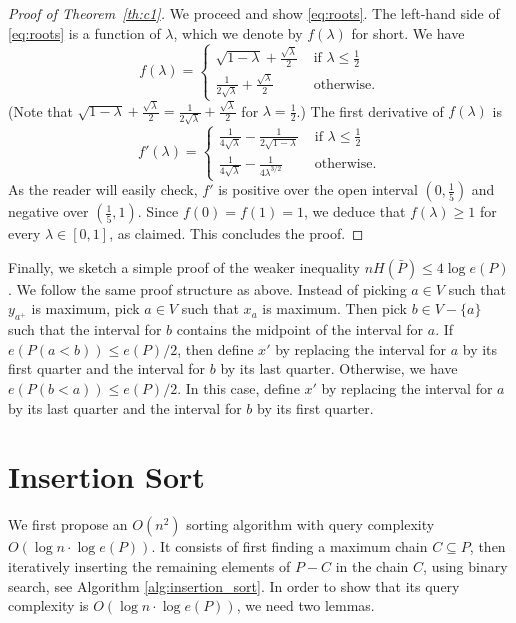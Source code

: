 \documentclass{article} \usepackage{fullpage}
\begin{document}
\begin{proof}[Proof of Theorem~\ref{th:c1}]
We proceed and show \eqref{eq:roots}. The left-hand side of \eqref{eq:roots} is a function of $\lambda$, which we denote by $f(\lambda)$ for short. We have
$$
f(\lambda) = \left \{
\begin{array}{ll}
\displaystyle
\sqrt{1 - \lambda} + \frac{\sqrt{\lambda}}{2}  & \textrm{ if } \lambda \leq \frac{1}{2} \\[2ex]
\displaystyle
\frac{1}{2\sqrt{\lambda}} + \frac{\sqrt{\lambda}}{2}  & \textrm{ otherwise.}
\end{array}
\right.
$$
(Note that $\sqrt{1 - \lambda} + \frac{\sqrt{\lambda}}{2} =
\frac{1}{2\sqrt{\lambda}} + \frac{\sqrt{\lambda}}{2}$ for $\lambda=\frac12$.)
The first derivative of $f(\lambda)$ is
$$
f'(\lambda) = \left \{
\begin{array}{ll}
\displaystyle
\frac{1}{4\sqrt{\lambda}} - \frac{1}{2\sqrt{1 - \lambda}}  & \textrm{ if } \lambda \leq \frac{1}{2} \\[2ex]
\displaystyle
\frac{1}{4\sqrt{\lambda}} - \frac{1}{4\lambda^{3/2}}  & \textrm{ otherwise.}
\end{array}
\right.
$$
As the reader will easily check, $f'$ is positive over the open interval $(0, \frac{1}{5})$
and negative over $(\frac{1}{5}, 1)$. Since $f(0)=f(1)=1$, we deduce that
$f(\lambda) \geq 1$ for every $\lambda \in [0,1]$, as claimed.
This concludes the proof.
\end{proof}

Finally, we sketch a simple proof of the weaker inequality $nH(\bar{P}) \leq 4 \log e(P)$. We follow the same proof structure as above. Instead of picking $a \in V$ such that $y_{a^+}$ is maximum,  pick $a \in V$ such that $x_a$ is maximum. Then pick $b \in V - \{a\}$ such that the interval for $b$ contains the midpoint of the interval for $a$. If $e(P(a<b)) \leq e(P)/2$, then define $x'$ by replacing the interval for $a$ by its first quarter and the interval for $b$ by its last quarter. Otherwise, we have $e(P(b<a)) \leq e(P)/2$. In this case, define $x'$ by replacing the interval for $a$ by its last quarter and the interval for $b$ by its first quarter.

\section{Insertion Sort}
\label{sec:insertion}

We first propose an $O(n^2)$ sorting algorithm with query complexity $O(\log n \cdot \log e(P))$. It consists of first finding a maximum chain $C\subseteq P$, then iteratively inserting the remaining elements of $P - C$ in the chain $C$, using binary search, see Algorithm \ref{alg:insertion_sort}. In order to show that its query complexity is $O(\log n \cdot \log e(P))$, we need two lemmas.
\end{document}
